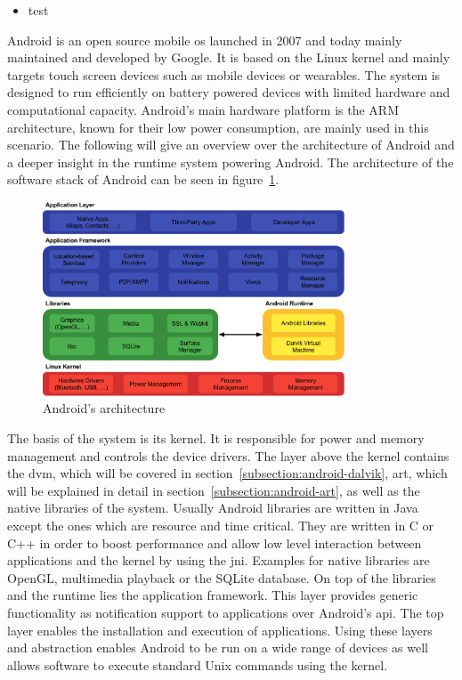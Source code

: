 \begin{itemize}
    \item test
\end{itemize}
Android is an open source mobile \gls{os} launched in 2007 and today mainly maintained and developed by Google.
It is based on the Linux kernel and mainly targets touch screen devices such as mobile devices or wearables.
The system is designed to run efficiently on battery powered devices with limited hardware and computational capacity.
Android's main hardware platform is the ARM architecture, known for their low power consumption, are mainly used in this scenario.
The following will give an overview over the architecture of Android and a deeper insight in the runtime system powering Android.
The architecture of the software stack of Android can be seen in figure~\ref{fig:androidArchitecture}.
\newline

\begin{figure}[h]
    \centering
    \includegraphics[width=0.8\textwidth]{data/stack.png}
    \caption{Android's architecture \cite{androidStack}}
    \label{fig:androidArchitecture}
\end{figure}

The basis of the system is its kernel.
It is responsible for power and memory management and controls the device drivers.
\newline
The layer above the kernel contains the \gls{dvm}, which will be covered in section~\ref{subsection:android-dalvik}, \gls{art}, which will be explained in detail in section~\ref{subsection:android-art}, as well as the native libraries of the system.
Usually Android libraries are written in Java except the ones which are resource and time critical.
They are written in C or C++ in order to boost performance and allow low level interaction between applications and the kernel by using the \gls{jni}.
Examples for native libraries are OpenGL, multimedia playback or the SQLite database.
\newline
On top of the libraries and the runtime lies the application framework.
This layer provides generic functionality as notification support to applications over Android's \gls{api}.
\newline
The top layer enables the installation and execution of applications.
\newline
Using these layers and abstraction enables Android to be run on a wide range of devices as well allows software to execute standard Unix commands using the kernel.
